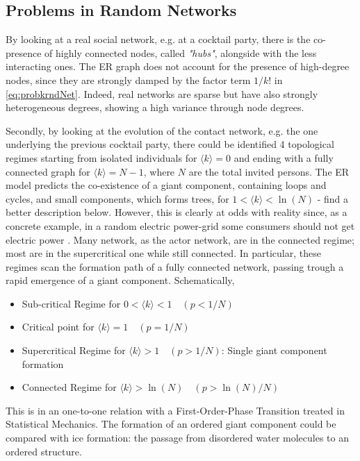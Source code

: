 \documentclass[a4paper,10pt]{book} %
\theoremstyle{definition}
\begin{document}
\subsection{Problems in Random Networks}

By looking at a real social network, e.g. at a cocktail party, there is the co-presence of highly connected nodes, called \textit{"hubs"}, alongside with the less interacting ones. The ER graph does not account for the presence of high-degree nodes\cite{barabasi::2016networkbook}, since they are strongly damped by the  factor term $1/k!$ in \autoref{eq:probkrndNet}. Indeed, real networks are sparse but have also strongly heterogeneous degrees, showing a high variance through node degrees.

Secondly, by looking at the evolution of the contact network, e.g. the one underlying the previous cocktail party, there could be identified 4 topological regimes starting from isolated individuals for $\langle k \rangle = 0$ and ending with a fully connected graph for $\langle k \rangle = N-1$, where $N$ are the total invited persons. The ER model predicts the co-existence of a giant component, containing loops and cycles, and small components, which forms trees, for $1 < \langle k\rangle < \ln(N)$ - find a better description below. However, this is clearly at odds with reality since, as a concrete example, in a random electric power-grid some consumers should not get electric power \cite{barabasi::2016networkbook}. Many network, as the actor network, are in the connected regime; most are in the supercritical one while still connected.
In particular, these regimes scan the formation path of a fully connected network, passing trough a rapid emergence of a giant component.
\newline Schematically,
\begin{itemize}[noitemsep]
	\item Sub-critical Regime for $0 < \langle k \rangle < 1 \quad (p < 1/N)$ 
	\item Critical point for $\langle k \rangle = 1 \quad (p = 1/N)$
	\item Supercritical Regime for $\langle k \rangle > 1 \quad (p > 1/N)$: Single giant component formation
	\item Connected Regime for $\langle k \rangle > \ln(N) \quad (p > \ln(N)/N)$
\end{itemize}
This is in an one-to-one relation with a First-Order-Phase Transition treated in Statistical Mechanics. The formation of an ordered giant component could be compared with ice formation: the passage from disordered water molecules to an ordered structure.
\end{document}
